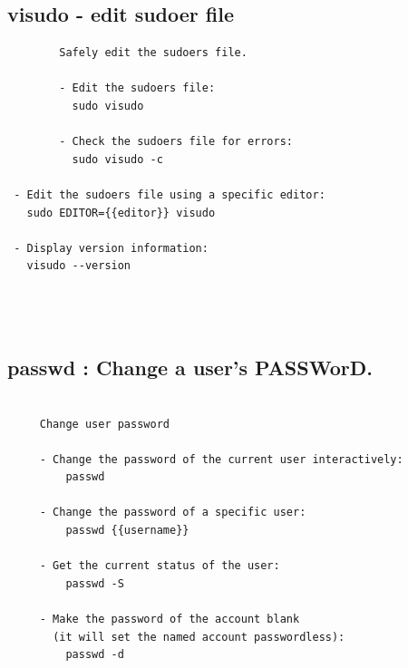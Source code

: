 \documentclass[a4paper,12pt]{article}
\begin{document}
\subsection{visudo - edit sudoer file  }
\begin{verbatim}
        Safely edit the sudoers file.

        - Edit the sudoers file:
          sudo visudo

        - Check the sudoers file for errors:
          sudo visudo -c

 - Edit the sudoers file using a specific editor:
   sudo EDITOR={{editor}} visudo

 - Display version information:
   visudo --version
    
  
       
\end{verbatim}




\subsection{passwd   : Change a user's PASSWorD.}
\begin{verbatim}
     
     Change user password
     
     - Change the password of the current user interactively:
         passwd

     - Change the password of a specific user:
         passwd {{username}}

     - Get the current status of the user:
         passwd -S

     - Make the password of the account blank 
       (it will set the named account passwordless):
         passwd -d
\end{verbatim}
\end{document}
